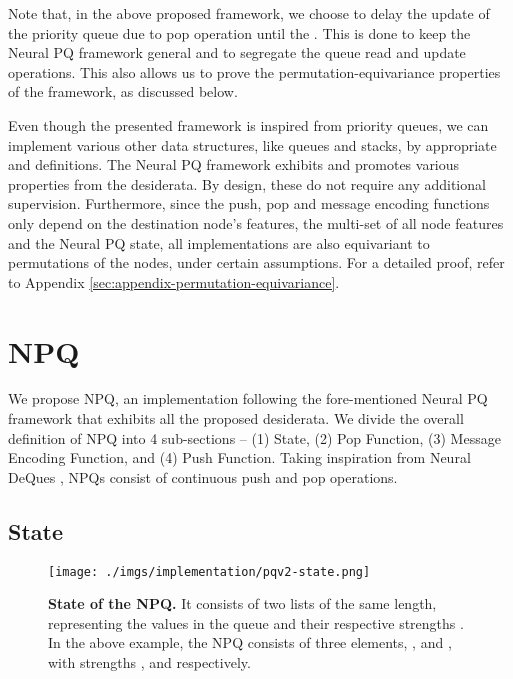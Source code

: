 \documentclass{article}
\theoremstyle{plain}
\theoremstyle{definition}
\theoremstyle{remark}
\begin{document}
Note that, in the above proposed framework, we choose to delay the update of the priority queue due to pop operation until the .
This is done to keep the Neural PQ framework general and to segregate the queue read and update
operations. This also allows us to prove the permutation-equivariance properties of the framework, as discussed below.

Even though the presented framework is inspired from priority queues, we can implement various other data structures, like queues and stacks, by appropriate
 and  definitions. The Neural PQ framework exhibits and promotes various properties from the desiderata.
By design, these do not require any additional supervision. Furthermore, since the push, pop and message encoding
functions only depend on the destination node's features, the multi-set of all node features and the Neural PQ state,
all implementations are also equivariant to permutations of the nodes, under certain assumptions. For a detailed proof, refer to
Appendix \ref{sec:appendix-permutation-equivariance}.

\section{NPQ}
\label{sec:pqv2}
We propose NPQ, an implementation following the fore-mentioned Neural PQ framework that exhibits all the proposed desiderata. We divide the overall definition of NPQ into
4 sub-sections -- (1) State, (2) Pop Function, (3) Message Encoding Function, and (4) Push Function. Taking inspiration from Neural DeQues \citep{Grefenstette-neural-queue},
NPQs consist of continuous push and pop operations.

\subsection{State}

\begin{figure}[tbh]
    \centering
    \texttt{[image: ./imgs/implementation/pqv2-state.png]}
    \caption[NPQ State]{\textbf{State of the NPQ.} It consists of two lists of the same length, representing the values  in the queue and their respective
             strengths . In the above example, the NPQ consists of three elements, ,  and ,
             with strengths ,  and  respectively.}
    \label{fig:pqv2=state}
\end{figure}
\end{document}
